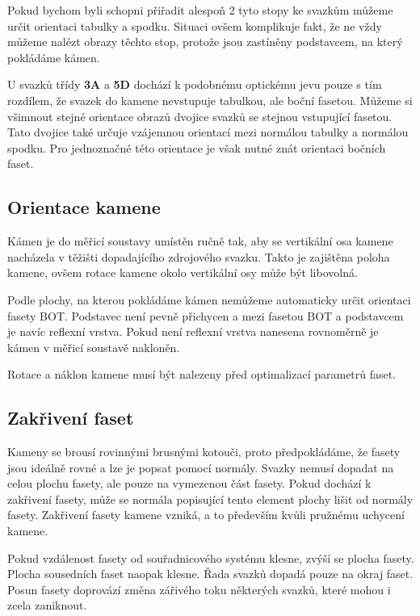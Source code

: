 Pokud bychom byli schopni přiřadit alespoň 2 tyto stopy ke svazkům můžeme určit orientaci tabulky a spodku. Situaci ovšem komplikuje fakt, že ne vždy můžeme nalézt obrazy těchto stop, protože jsou zastíněny podstavcem, na který pokládáme kámen. 
 
 U svazků třídy \textbf{3A} a \textbf{5D} dochází k podobnému optickému jevu pouze s tím rozdílem, že svazek do kamene nevstupuje tabulkou, ale boční fasetou. Můžeme si všimnout stejné orientace obrazů dvojice svazků se stejnou vstupující fasetou. Tato dvojice také určuje vzájemnou orientací mezi normálou tabulky a normálou spodku. Pro jednoznačné této orientace je však nutné znát orientaci bočních faset.  


\subsection{Orientace kamene}
Kámen je do měřicí soustavy umístěn ručně tak, aby se vertikální osa kamene nacházela v těžišti dopadajícího zdrojového svazku. Takto je zajištěna poloha kamene, ovšem rotace kamene okolo vertikální osy může být libovolná. 

Podle plochy, na kterou pokládáme kámen nemůžeme automaticky určit orientaci fasety BOT. Podstavec není pevně přichycen a mezi fasetou BOT a podstavcem je navíc reflexní vrstva. Pokud není reflexní vrstva nanesena rovnoměrně je kámen v měřicí soustavě nakloněn.

Rotace a náklon kamene musí být nalezeny před optimalizací parametrů faset. 



\subsection{Zakřivení faset} 

Kameny se brousí rovinnými brusnými kotouči, proto předpokládáme, že fasety jsou ideálně rovné a lze je popsat pomocí normály. Svazky nemusí dopadat na celou plochu fasety, ale pouze na vymezenou část fasety. Pokud dochází k zakřivení fasety, může se normála popisující tento element plochy lišit od normály fasety. Zakřivení fasety kamene vzniká, a to především kvůli pružnému uchycení kamene. 

Pokud vzdálenost fasety od souřadnicového systému klesne, zvýší se plocha fasety. Plocha sousedních faset naopak klesne. Řada svazků dopadá pouze na okraj faset. Posun fasety doprovází změna zářivého toku některých svazků, které mohou i zcela zaniknout.


